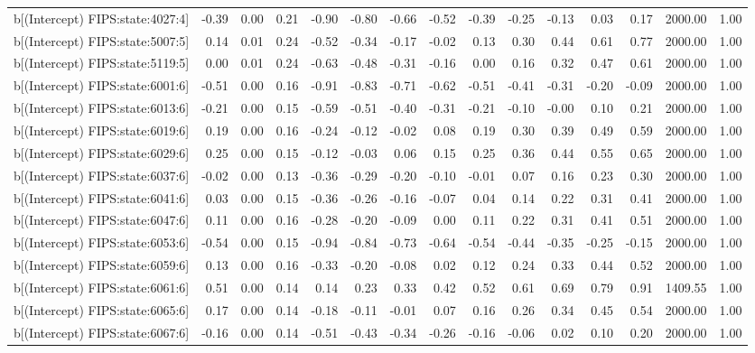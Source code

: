 \begin{table}[ht]
\begin{tabular}{rrrrrrrrrrrrrrr}
  b[(Intercept) FIPS:state:4027:4] & -0.39 & 0.00 & 0.21 & -0.90 & -0.80 & -0.66 & -0.52 & -0.39 & -0.25 & -0.13 & 0.03 & 0.17 & 2000.00 & 1.00 \\ 
  b[(Intercept) FIPS:state:5007:5] & 0.14 & 0.01 & 0.24 & -0.52 & -0.34 & -0.17 & -0.02 & 0.13 & 0.30 & 0.44 & 0.61 & 0.77 & 2000.00 & 1.00 \\ 
  b[(Intercept) FIPS:state:5119:5] & 0.00 & 0.01 & 0.24 & -0.63 & -0.48 & -0.31 & -0.16 & 0.00 & 0.16 & 0.32 & 0.47 & 0.61 & 2000.00 & 1.00 \\ 
  b[(Intercept) FIPS:state:6001:6] & -0.51 & 0.00 & 0.16 & -0.91 & -0.83 & -0.71 & -0.62 & -0.51 & -0.41 & -0.31 & -0.20 & -0.09 & 2000.00 & 1.00 \\ 
  b[(Intercept) FIPS:state:6013:6] & -0.21 & 0.00 & 0.15 & -0.59 & -0.51 & -0.40 & -0.31 & -0.21 & -0.10 & -0.00 & 0.10 & 0.21 & 2000.00 & 1.00 \\ 
  b[(Intercept) FIPS:state:6019:6] & 0.19 & 0.00 & 0.16 & -0.24 & -0.12 & -0.02 & 0.08 & 0.19 & 0.30 & 0.39 & 0.49 & 0.59 & 2000.00 & 1.00 \\ 
  b[(Intercept) FIPS:state:6029:6] & 0.25 & 0.00 & 0.15 & -0.12 & -0.03 & 0.06 & 0.15 & 0.25 & 0.36 & 0.44 & 0.55 & 0.65 & 2000.00 & 1.00 \\ 
  b[(Intercept) FIPS:state:6037:6] & -0.02 & 0.00 & 0.13 & -0.36 & -0.29 & -0.20 & -0.10 & -0.01 & 0.07 & 0.16 & 0.23 & 0.30 & 2000.00 & 1.00 \\ 
  b[(Intercept) FIPS:state:6041:6] & 0.03 & 0.00 & 0.15 & -0.36 & -0.26 & -0.16 & -0.07 & 0.04 & 0.14 & 0.22 & 0.31 & 0.41 & 2000.00 & 1.00 \\ 
  b[(Intercept) FIPS:state:6047:6] & 0.11 & 0.00 & 0.16 & -0.28 & -0.20 & -0.09 & 0.00 & 0.11 & 0.22 & 0.31 & 0.41 & 0.51 & 2000.00 & 1.00 \\ 
  b[(Intercept) FIPS:state:6053:6] & -0.54 & 0.00 & 0.15 & -0.94 & -0.84 & -0.73 & -0.64 & -0.54 & -0.44 & -0.35 & -0.25 & -0.15 & 2000.00 & 1.00 \\ 
  b[(Intercept) FIPS:state:6059:6] & 0.13 & 0.00 & 0.16 & -0.33 & -0.20 & -0.08 & 0.02 & 0.12 & 0.24 & 0.33 & 0.44 & 0.52 & 2000.00 & 1.00 \\ 
  b[(Intercept) FIPS:state:6061:6] & 0.51 & 0.00 & 0.14 & 0.14 & 0.23 & 0.33 & 0.42 & 0.52 & 0.61 & 0.69 & 0.79 & 0.91 & 1409.55 & 1.00 \\ 
  b[(Intercept) FIPS:state:6065:6] & 0.17 & 0.00 & 0.14 & -0.18 & -0.11 & -0.01 & 0.07 & 0.16 & 0.26 & 0.34 & 0.45 & 0.54 & 2000.00 & 1.00 \\ 
  b[(Intercept) FIPS:state:6067:6] & -0.16 & 0.00 & 0.14 & -0.51 & -0.43 & -0.34 & -0.26 & -0.16 & -0.06 & 0.02 & 0.10 & 0.20 & 2000.00 & 1.00 \\ 

\end{tabular}
\end{table}
